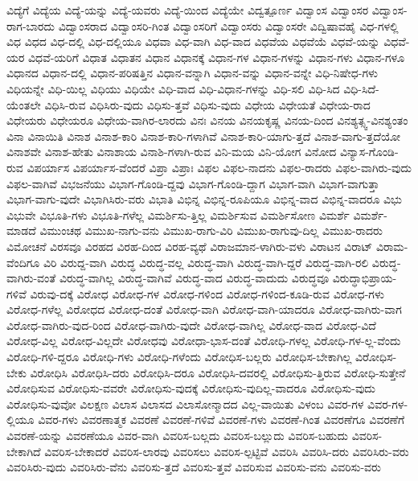 {ವಿದ್ಯೆಗೆ
ವಿದ್ಯೆಯ
ವಿದ್ಯೆ-ಯನ್ನು
ವಿದ್ಯೆ-ಯವರು
ವಿದ್ಯೆ-ಯಿಂದ
ವಿದ್ಯೆಯೇ
ವಿದ್ವತ್ಪೂರ್ಣ
ವಿದ್ವಾಂಸ
ವಿದ್ವಾಂಸರ
ವಿದ್ವಾಂಸ-ರಾಗ-ಬಾರದು
ವಿದ್ವಾಂಸರಾದ
ವಿದ್ವಾಂಸರಿ-ಗಿಂತ
ವಿದ್ವಾಂಸರಿಗೆ
ವಿದ್ವಾಂಸರು
ವಿದ್ವಾಂಸರೇ
ವಿದ್ವಿಷಾವಹೈ
ವಿಧ-ಗಳಲ್ಲಿ
ವಿಧ
ವಿಧದ
ವಿಧ-ದಲ್ಲಿ
ವಿಧ-ದಲ್ಲಿಯೂ
ವಿಧವಾ
ವಿಧ-ವಾಗಿ
ವಿಧ-ವಾದ
ವಿಧವೆಯ
ವಿಧವೆಯೆ
ವಿಧವೆ-ಯನ್ನು
ವಿಧವೆ-ಯರ
ವಿಧವೆ-ಯರಿಗೆ
ವಿಧಾತ
ವಿಧಾತನ
ವಿಧಾನ
ವಿಧಾನಕ್ಕೆ
ವಿಧಾನ-ಗಳ
ವಿಧಾನ-ಗಳನ್ನು
ವಿಧಾನ-ಗಳು
ವಿಧಾನ-ಗಳೂ
ವಿಧಾನದ
ವಿಧಾನ-ದಲ್ಲಿ
ವಿಧಾನ-ಪರಿಷತ್ತಿನ
ವಿಧಾನ-ವನ್ನಾಗಿ
ವಿಧಾನ-ವನ್ನು
ವಿಧಾನ-ವನ್ನೇ
ವಿಧಿ-ನಿಷೇಧ-ಗಳು
ವಿಧಿಯನ್ನೇ
ವಿಧಿ-ಯಿಲ್ಲ
ವಿಧಿಯು
ವಿಧಿಯೇ
ವಿಧಿ-ವಾದ
ವಿಧಿ-ವಿಧಾನ-ಗಳನ್ನು
ವಿಧಿ-ಸಲಿ
ವಿಧಿ-ಸಿದ
ವಿಧಿ-ಸಿದೆ-ಯೆಂತಲೇ
ವಿಧಿಸಿ-ರುವ
ವಿಧಿಸಿರು-ವುದು
ವಿಧಿಸು-ತ್ತವೆ
ವಿಧಿಸು-ವುದು
ವಿಧೇಯ
ವಿಧೇಯತೆ
ವಿಧೇಯ-ರಾದ
ವಿಧೇಯರು
ವಿಧೇಯರೂ
ವಿಧೇಯ-ವಾಗಿರ-ಲಾರದು
ವಿನಃ
ವಿನಯ
ವಿನಯಕೃಷ್ಣ
ವಿನಯ-ದಿಂದ
ವಿನಶ್ಯತ್ಸ್ವ-ವಿನಶ್ಯಂತಂ
ವಿನಾ
ವಿನಾಯಿತಿ
ವಿನಾಶ
ವಿನಾಶ-ಕಾರಿ
ವಿನಾಶ-ಕಾರಿ-ಗಳಾಗಿವೆ
ವಿನಾಶ-ಕಾರಿ-ಯಾಗು-ತ್ತದೆ
ವಿನಾಶ-ವಾಗು-ತ್ತದೆಯೋ
ವಿನಾಶವೇ
ವಿನಾಶ-ಹೇತು
ವಿನಾಶಾಯ
ವಿನಾಶಿ-ಗಳಾಗಿ-ರುವ
ವಿನಿ-ಮಯ
ವಿನಿ-ಯೋಗ
ವಿನೋದ
ವಿನ್ಯಾಸ-ಗೊಂಡಿ-ರುವ
ವಿಪರ್ಯಾಸ
ವಿಪರ್ಯಾಸ-ವೆಂದರೆ
ವಿಪ್ರಾ
ವಿಪ್ರಾಃ
ವಿಫಲ
ವಿಫಲ-ನಾದನು
ವಿಫಲ-ರಾದರು
ವಿಫಲ-ವಾಗಿರು-ವುದು
ವಿಫಲ-ವಾಗಿವೆ
ವಿಭಜನೆಯು
ವಿಭಾಗ-ಗೊಂಡಿ-ದ್ದವು
ವಿಭಾಗ-ಗೊಂಡಿ-ದ್ದಾಗ
ವಿಭಾಗ-ವಾಗಿ
ವಿಭಾಗ-ವಾಗುತ್ತಾ
ವಿಭಾಗ-ವಾಗು-ವುದೇ
ವಿಭಾಗಿಸಿರು-ವರು
ವಿಭಾತಿ
ವಿಭಿನ್ನ
ವಿಭಿನ್ನ-ರೂಪಿಯೂ
ವಿಭಿನ್ನ-ವಾದ
ವಿಭಿನ್ನ-ವಾದರೂ
ವಿಭು
ವಿಭುವೇ
ವಿಭೂತಿ-ಗಳು
ವಿಭೂತಿ-ಗಳೆಲ್ಲ
ವಿಮರ್ಶಿಸು-ತ್ತಿಲ್ಲ
ವಿಮರ್ಶಿಸುವ
ವಿಮರ್ಶಿಸೋಣ
ವಿಮರ್ಶೆ
ವಿಮರ್ಶೆ-ಮಾಡದೆ
ವಿಮುಂಚಥ
ವಿಮುಖ-ನಾಗು-ವನು
ವಿಮುಖ-ರಾಗು-ವಿರಿ
ವಿಮುಖ-ರಾಗುವು-ದಿಲ್ಲ
ವಿಮುಖ-ರಾದರು
ವಿಮೋಚನೆ
ವಿರಸವೂ
ವಿರಹದ
ವಿರಹ-ದಿಂದ
ವಿರಹ-ವ್ಯಥೆ
ವಿರಾಜಮಾನ-ಳಾಗಿರು-ವಳು
ವಿರಾಟನ
ವಿರಾಟ್
ವಿರಾಮ-ವೆಂದಿಗೂ
ವಿರಿ
ವಿರುದ್ದ-ವಾಗಿ
ವಿರುದ್ಧ
ವಿರುದ್ಧ-ವಲ್ಲ
ವಿರುದ್ಧ-ವಾಗಿ
ವಿರುದ್ಧ-ವಾಗಿ-ದ್ದರೆ
ವಿರುದ್ಧ-ವಾಗಿ-ರಲಿ
ವಿರುದ್ಧ-ವಾಗಿರು-ವಂತೆ
ವಿರುದ್ಧ-ವಾಗಿಲ್ಲ
ವಿರುದ್ಧ-ವಾಗಿವೆ
ವಿರುದ್ಧ-ವಾದ
ವಿರುದ್ಧ-ವಾದುದು
ವಿರುದ್ಧವೂ
ವಿರುದ್ಧಾಭಿಪ್ರಾಯ-ಗಳಿವೆ
ವಿರುವು-ದಕ್ಕೆ
ವಿರೋಧ
ವಿರೋಧ-ಗಳ
ವಿರೋಧ-ಗಳಿಂದ
ವಿರೋಧ-ಗಳಿಂದ-ಕೂಡಿ-ರುವ
ವಿರೋಧ-ಗಳು
ವಿರೋಧ-ಗಳೆಲ್ಲ
ವಿರೋಧದ
ವಿರೋಧ-ದಂತೆ
ವಿರೋಧ-ವಾಗಿ
ವಿರೋಧ-ವಾಗಿ-ಯಾದರೂ
ವಿರೋಧ-ವಾಗಿರು-ವಾಗ
ವಿರೋಧ-ವಾಗಿರು-ವುದ-ರಿಂದ
ವಿರೋಧ-ವಾಗಿರು-ವುದೇ
ವಿರೋಧ-ವಾಗಿಲ್ಲ
ವಿರೋಧ-ವಾದ
ವಿರೋಧ-ವಿದೆ
ವಿರೋಧ-ವಿಲ್ಲ
ವಿರೋಧ-ವಿಲ್ಲದೇ
ವಿರೋಧವು
ವಿರೋಧಾ-ಭಾಸ-ದಂತೆ
ವಿರೋಧಿ-ಗಳಲ್ಲ
ವಿರೋಧಿ-ಗಳ-ಲ್ಲ-ವೆಂದು
ವಿರೋಧಿ-ಗಳಿ-ದ್ದರೂ
ವಿರೋಧಿ-ಗಳು
ವಿರೋಧಿ-ಗಳೆಂದು
ವಿರೋಧಿಸ-ಬಲ್ಲರು
ವಿರೋಧಿಸ-ಬೇಕಾಗಿಲ್ಲ
ವಿರೋಧಿಸ-ಬೇಕು
ವಿರೋಧಿಸಿ
ವಿರೋಧಿಸಿ-ದರು
ವಿರೋಧಿಸಿ-ದರೂ
ವಿರೋಧಿಸಿ-ದವರಲ್ಲಿ
ವಿರೋಧಿಸು-ತ್ತಿರುವ
ವಿರೋಧಿ-ಸುತ್ತೇನೆ
ವಿರೋಧಿಸುವ
ವಿರೋಧಿಸು-ವವರೇ
ವಿರೋಧಿಸು-ವುದಕ್ಕೆ
ವಿರೋಧಿಸು-ವುದಿಲ್ಲ-ವಾದರೂ
ವಿರೋಧಿಸು-ವುದು
ವಿರೋಧಿಸು-ವುವೋ
ವಿಲಕ್ಷಣ
ವಿಲಾಸ
ವಿಲಾಸದ
ವಿಲಾಸೋನ್ಮಾದದ
ವಿಲ್ಲ-ವಾಯಿತು
ವಿಳಂಬ
ವಿವರ-ಗಳ
ವಿವರ-ಗಳ-ಲ್ಲಿಯೂ
ವಿವರ-ಗಳು
ವಿವರಣಾತ್ಮಕ
ವಿವರಣೆ
ವಿವರಣೆ-ಗಳಿವೆ
ವಿವರಣೆ-ಗಳು
ವಿವರಣೆ-ಗಿಂತ
ವಿವರಣೆಗೂ
ವಿವರಣೆಗೆ
ವಿವರಣೆ-ಯನ್ನು
ವಿವರಣೆಯೂ
ವಿವರ-ವಾಗಿ
ವಿವರಿಸ-ಬಲ್ಲದು
ವಿವರಿಸ-ಬಲ್ಲುದು
ವಿವರಿಸ-ಬಹುದು
ವಿವರಿಸ-ಬೇಕಾಗಿದೆ
ವಿವರಿಸ-ಬೇಕಾದರೆ
ವಿವರಿಸ-ಲಾರವು
ವಿವರಿಸಲು
ವಿವರಿಸ-ಲ್ಪಟ್ಟಿವೆ
ವಿವರಿಸಿ
ವಿವರಿಸಿ-ದರು
ವಿವರಿಸಿರು-ವರು
ವಿವರಿಸಿರು-ವುದು
ವಿವರಿಸಿರು-ವೆನು
ವಿವರಿಸು-ತ್ತದೆ
ವಿವರಿಸು-ತ್ತವೆ
ವಿವರಿಸುವ
ವಿವರಿಸು-ವನು
ವಿವರಿಸು-ವರು
}

